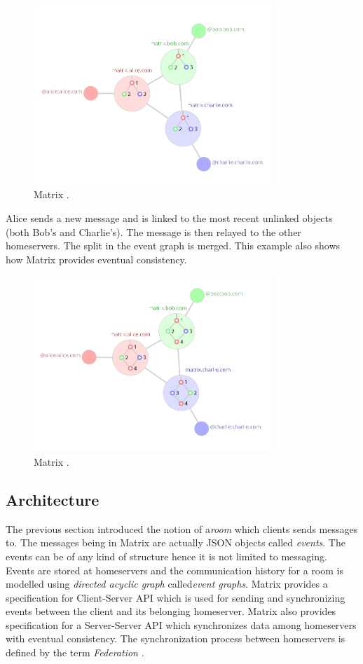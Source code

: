 \begin{figure}[H]
	\centering
	\includegraphics[width=9cm]{figures/matrix4.png}
	\caption{ Matrix \cite{matrixhome}.}
	\label{fig:matrix4}
\end{figure}

Alice sends a new message and is linked to the most recent unlinked objects (both Bob's and Charlie's). The message is then relayed to the other homeservers. The split in the event graph is merged. This example also shows how Matrix provides eventual consistency.

\begin{figure}[H]
	\centering
	\includegraphics[width=9cm]{figures/matrix5.png}
	\caption{ Matrix \cite{matrixhome}.}
	\label{fig:matrix5}
\end{figure}



\subsection{Architecture} \label{matrix:architecture}
The previous section introduced the notion of a\emph{room} which clients sends messages to. The messages being in Matrix are actually JSON objects called \emph{events}. The events can be of any kind of structure hence it is not limited to messaging. Events are stored at homeservers and the communication history for a room is modelled using \emph{directed acyclic graph} called\emph{event graphs}. Matrix provides a specification for Client-Server API which is used for sending and synchronizing events between the client and its belonging homeserver. Matrix also provides specification for a Server-Server API which synchronizes data among homeservers with eventual consistency. The synchronization process between homeservers is defined by the term \emph{Federation} \cite{matrixspec}. 


